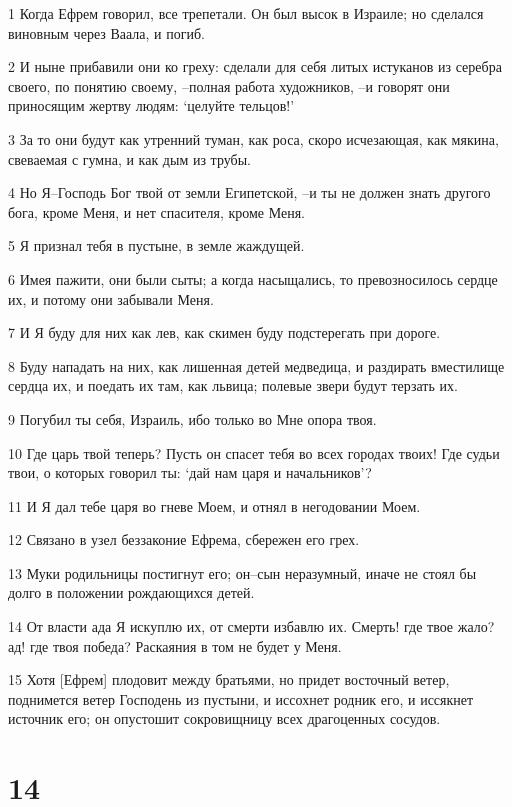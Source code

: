 \par 1 Когда Ефрем говорил, все трепетали. Он был высок в Израиле; но сделался виновным через Ваала, и погиб.
\par 2 И ныне прибавили они ко греху: сделали для себя литых истуканов из серебра своего, по понятию своему, --полная работа художников, --и говорят они приносящим жертву людям: `целуйте тельцов!'
\par 3 За то они будут как утренний туман, как роса, скоро исчезающая, как мякина, свеваемая с гумна, и как дым из трубы.
\par 4 Но Я--Господь Бог твой от земли Египетской, --и ты не должен знать другого бога, кроме Меня, и нет спасителя, кроме Меня.
\par 5 Я признал тебя в пустыне, в земле жаждущей.
\par 6 Имея пажити, они были сыты; а когда насыщались, то превозносилось сердце их, и потому они забывали Меня.
\par 7 И Я буду для них как лев, как скимен буду подстерегать при дороге.
\par 8 Буду нападать на них, как лишенная детей медведица, и раздирать вместилище сердца их, и поедать их там, как львица; полевые звери будут терзать их.
\par 9 Погубил ты себя, Израиль, ибо только во Мне опора твоя.
\par 10 Где царь твой теперь? Пусть он спасет тебя во всех городах твоих! Где судьи твои, о которых говорил ты: `дай нам царя и начальников'?
\par 11 И Я дал тебе царя во гневе Моем, и отнял в негодовании Моем.
\par 12 Связано в узел беззаконие Ефрема, сбережен его грех.
\par 13 Муки родильницы постигнут его; он--сын неразумный, иначе не стоял бы долго в положении рождающихся детей.
\par 14 От власти ада Я искуплю их, от смерти избавлю их. Смерть! где твое жало? ад! где твоя победа? Раскаяния в том не будет у Меня.
\par 15 Хотя [Ефрем] плодовит между братьями, но придет восточный ветер, поднимется ветер Господень из пустыни, и иссохнет родник его, и иссякнет источник его; он опустошит сокровищницу всех драгоценных сосудов.

\chapter{14}

